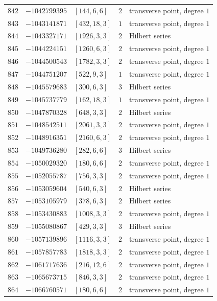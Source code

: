 \documentclass[11pt]{article}
\begin{document}
\begin{center}
\begin{longtable}{r r l c l}
$842$ & $-1042799395$ & $[144,6,6]$ & $2$ & transverse point, degree $1$\\
$843$ & $-1043141871$ & $[432,18,3]$ & $1$ & transverse point, degree $1$\\
$844$ & $-1043327171$ & $[1926,3,3]$ & $2$ & Hilbert series\\
$845$ & $-1044224151$ & $[1260,6,3]$ & $2$ & transverse point, degree $1$\\
$846$ & $-1044500543$ & $[1782,3,3]$ & $2$ & transverse point, degree $1$\\
$847$ & $-1044751207$ & $[522,9,3]$ & $1$ & transverse point, degree $1$\\
$848$ & $-1045579683$ & $[300,6,3]$ & $3$ & Hilbert series\\
$849$ & $-1045737779$ & $[162,18,3]$ & $1$ & transverse point, degree $1$\\
$850$ & $-1047870328$ & $[648,3,3]$ & $2$ & Hilbert series\\
$851$ & $-1048542511$ & $[2061,3,3]$ & $2$ & transverse point, degree $1$\\
$852$ & $-1048916351$ & $[2160,6,3]$ & $2$ & transverse point, degree $1$\\
$853$ & $-1049736280$ & $[282,6,6]$ & $3$ & Hilbert series\\
$854$ & $-1050029320$ & $[180,6,6]$ & $2$ & transverse point, degree $1$\\
$855$ & $-1052055787$ & $[756,3,3]$ & $2$ & transverse point, degree $1$\\
$856$ & $-1053059604$ & $[540,6,3]$ & $2$ & Hilbert series\\
$857$ & $-1053105979$ & $[378,6,3]$ & $2$ & Hilbert series\\
$858$ & $-1053430883$ & $[1008,3,3]$ & $2$ & transverse point, degree $1$\\
$859$ & $-1055080867$ & $[429,3,3]$ & $3$ & Hilbert series\\
$860$ & $-1057139896$ & $[1116,3,3]$ & $2$ & transverse point, degree $1$\\
$861$ & $-1057857783$ & $[1818,3,3]$ & $2$ & transverse point, degree $1$\\
$862$ & $-1061717636$ & $[216,12,6]$ & $2$ & transverse point, degree $1$\\
$863$ & $-1065673715$ & $[846,3,3]$ & $2$ & transverse point, degree $1$\\
$864$ & $-1066760571$ & $[180,6,6]$ & $2$ & transverse point, degree $1$\\
\end{longtable}
\end{center}
\end{document}
